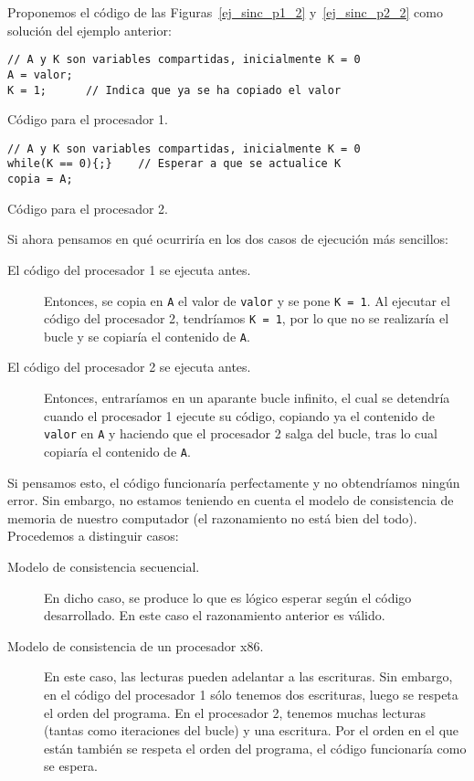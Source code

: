 \begin{ejemplo}
    Proponemos el código de las Figuras~\ref{ej_sinc_p1_2} y~\ref{ej_sinc_p2_2} como solución del ejemplo anterior:
\begin{listing}[H]
\centering
\begin{verbatim}
// A y K son variables compartidas, inicialmente K = 0
A = valor; 
K = 1;      // Indica que ya se ha copiado el valor
\end{verbatim}
\caption{Código para el procesador 1.}
\label{ej_sinc_p1_2}
\end{listing}

\begin{listing}[H]
\centering
\begin{verbatim}
// A y K son variables compartidas, inicialmente K = 0
while(K == 0){;}    // Esperar a que se actualice K
copia = A;
\end{verbatim}
\caption{Código para el procesador 2.}
\label{ej_sinc_p2_2}
\end{listing}
Si ahora pensamos en qué ocurriría en los dos casos de ejecución más sencillos:
\begin{description}
    \item [El código del procesador 1 se ejecuta antes.] Entonces, se copia en \verb|A| el valor de \verb|valor| y se pone \verb|K = 1|. Al ejecutar el código del procesador 2, tendríamos \verb|K = 1|, por lo que no se realizaría el bucle y se copiaría el contenido de \verb|A|.
    \item [El código del procesador 2 se ejecuta antes.] Entonces, entraríamos en un aparante bucle infinito, el cual se detendría cuando el procesador 1 ejecute su código, copiando ya el contenido de \verb|valor| en \verb|A| y haciendo que el procesador 2 salga del bucle, tras lo cual copiaría el contenido de \verb|A|.
\end{description}
Si pensamos esto, el código funcionaría perfectamente y no obtendríamos ningún error. Sin embargo, no estamos teniendo en cuenta el modelo de consistencia de memoria de nuestro computador (el razonamiento no está bien del todo). Procedemos a distinguir casos:
\begin{description}
    \item [Modelo de consistencia secuencial.] En dicho caso, se produce lo que es lógico esperar según el código desarrollado. En este caso el razonamiento anterior es válido.
    \item [Modelo de consistencia de un procesador x86.] En este caso, las lecturas pueden adelantar a las escrituras. Sin embargo, en el código del procesador 1 sólo tenemos dos escrituras, luego se respeta el orden del programa. En el procesador 2, tenemos muchas lecturas (tantas como iteraciones del bucle) y una escritura. Por el orden en el que están también se respeta el orden del programa, el código funcionaría como se espera.

\end{description}
\end{ejemplo}
